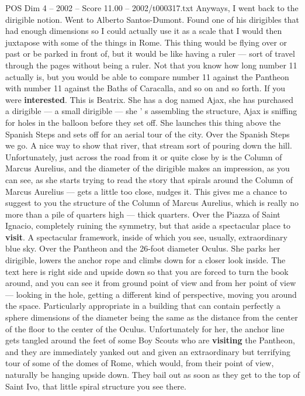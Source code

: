 \begin{textsample}{POS Dim 4 – 2002 – Score 11.00 – 2002/t000317.txt}
Anyways, I went back to the dirigible notion.
Went to Alberto Santos-Dumont.
Found one of his dirigibles that had enough dimensions so I could actually use it as a scale that I would then juxtapose with some of the things in Rome.
This thing would be flying over or past or be parked in front of, but it would be like having a ruler — sort of travel through the pages without being a ruler.
Not that you know how long number 11 actually is, but you would be able to compare number 11 against the Pantheon with number 11 against the Baths of Caracalla, and so on and so forth.
If you were \textbf{interested}.
This is Beatrix.
She has a dog named Ajax, she has purchased a dirigible — a small dirigible — she ' s assembling the structure, Ajax is sniffing for holes in the balloon before they set off.
She launches this thing above the Spanish Steps and sets off for an aerial tour of the city.
Over the Spanish Steps we go.
A nice way to show that river, that stream sort of pouring down the hill.
Unfortunately, just across the road from it or quite close by is the Column of Marcus Aurelius, and the diameter of the dirigible makes an impression, as you can see, as she starts trying to read the story that spirals around the Column of Marcus Aurelius — gets a little too close, nudges it.
This gives me a chance to suggest to you the structure of the Column of Marcus Aurelius, which is really no more than a pile of quarters high — thick quarters.
Over the Piazza of Saint Ignacio, completely ruining the symmetry, but that aside a spectacular place to \textbf{visit}.
A spectacular framework, inside of which you see, usually, extraordinary blue sky.
Over the Pantheon and the 26-foot diameter Oculus.
She parks her dirigible, lowers the anchor rope and climbs down for a closer look inside.
The text here is right side and upside down so that you are forced to turn the book around, and you can see it from ground point of view and from her point of view — looking in the hole, getting a different kind of perspective, moving you around the space.
Particularly appropriate in a building that can contain perfectly a sphere dimensions of the diameter being the same as the distance from the center of the floor to the center of the Oculus.
Unfortunately for her, the anchor line gets tangled around the feet of some Boy Scouts who are \textbf{visiting} the Pantheon, and they are immediately yanked out and given an extraordinary but terrifying tour of some of the domes of Rome, which would, from their point of view, naturally be hanging upside down.
They bail out as soon as they get to the top of Saint Ivo, that little spiral structure you see there.

\end{textsample}
